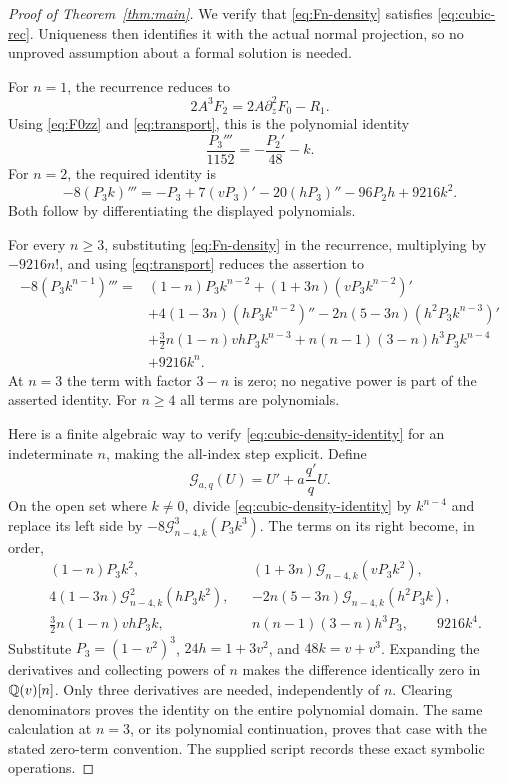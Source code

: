 \begin{proof}[Proof of Theorem~\ref{thm:main}]
We verify that \eqref{eq:Fn-density} satisfies
\eqref{eq:cubic-rec}. Uniqueness then identifies it with the actual
normal projection, so no unproved assumption about a formal solution is
needed.

For $n=1$, the recurrence reduces to
\[
 2A^3F_2=2A\partial_z^2F_0-R_1.
\]
Using \eqref{eq:F0zz} and \eqref{eq:transport}, this is the polynomial
identity
\begin{equation}\label{eq:cubic-base1}
 \frac{P_3'''}{1152}=-\frac{P_2'}{48}-k.
\end{equation}
For $n=2$, the required identity is
\begin{equation}\label{eq:cubic-base2}
 -8(P_3k)'''=-P_3+7(vP_3)'-20(hP_3)''-96P_2h+9216k^2.
\end{equation}
Both follow by differentiating the displayed polynomials.

For every $n\ge3$, substituting \eqref{eq:Fn-density} in the
recurrence, multiplying by $-9216n!$, and using
\eqref{eq:transport} reduces the assertion to
\begin{equation}\label{eq:cubic-density-identity}
\begin{split}
 -8(P_3k^{n-1})'''={}&(1-n)P_3k^{n-2}
 +(1+3n)(vP_3k^{n-2})'\\
 &+4(1-3n)(hP_3k^{n-2})''
 -2n(5-3n)(h^2P_3k^{n-3})'\\
 &+\frac32n(1-n)vhP_3k^{n-3}
 +n(n-1)(3-n)h^3P_3k^{n-4}\!\\
 &+9216k^n.
\end{split}
\end{equation}
At $n=3$ the term with factor $3-n$ is zero; no negative power is
part of the asserted identity. For $n\ge4$ all terms are polynomials.

Here is a finite algebraic way to verify \eqref{eq:cubic-density-identity}
for an indeterminate $n$, making the all-index step explicit. Define
\[
 \mathcal G_{a,q}(U)=U'+a\frac{q'}qU.
\]
On the open set where $k\ne0$, divide \eqref{eq:cubic-density-identity}
by $k^{n-4}$ and replace its left side by
$-8\mathcal G_{n-4,k}^3(P_3k^3)$. The terms on its right become,
in order,
\begin{align*}
 &(1-n)P_3k^2,
 &&(1+3n)\mathcal G_{n-4,k}(vP_3k^2),\\
 &4(1-3n)\mathcal G_{n-4,k}^2(hP_3k^2),
 &&-2n(5-3n)\mathcal G_{n-4,k}(h^2P_3k),\\
 &\tfrac32n(1-n)vhP_3k,
 &&n(n-1)(3-n)h^3P_3,
 \qquad 9216k^4.
\end{align*}
Substitute $P_3=(1-v^2)^3$, $24h=1+3v^2$, and $48k=v+v^3$.
Expanding the derivatives and collecting powers of $n$ makes the
difference identically zero in $\mathbb Q(v)[n]$. Only three derivatives are
needed, independently of $n$. Clearing denominators proves the identity
on the entire polynomial domain. The same calculation at $n=3$, or its
polynomial continuation, proves that case with the stated zero-term
convention. The supplied script records these exact symbolic operations.


\end{proof}
